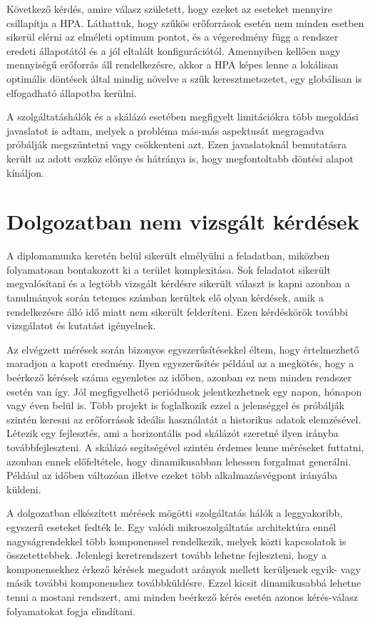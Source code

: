 Következő kérdés, amire válasz született, hogy ezeket az eseteket mennyire csillapítja a HPA.
Láthattuk, hogy szűkös erőforrások esetén nem minden esetben sikerül elérni az elméleti optimum pontot, és a végeredmény függ a rendszer eredeti állapotától és a jól eltalált konfigurációtól.
Amennyiben kellően nagy mennyiségű erőforrás áll rendelkezésre, akkor a HPA képes lenne a lokálisan optimális döntések által mindig növelve a szűk keresztmetszetet, egy globálisan is elfogadható állapotba kerülni.

A szolgáltatáshálók és a skálázó esetében megfigyelt limitációkra több megoldási javaslatot is adtam, melyek a probléma más-más aspektusát megragadva próbálják megszüntetni vagy csökkenteni azt.
Ezen javaslatoknál bemutatásra került az adott eszköz előnye és hátránya is, hogy megfontoltabb döntési alapot kínáljon.

\section{Dolgozatban nem vizsgált kérdések}
A diplomamunka keretén belül sikerült elmélyülni a feladatban, miközben folyamatosan bontakozott ki a terület komplexitása.
Sok feladatot sikerült megvalósítani és a legtöbb vizsgált kérdésre sikerült választ is kapni azonban a tanulmányok során tetemes számban kerültek elő olyan kérdések, amik a rendelkezésre álló idő miatt nem sikerült felderíteni.
Ezen kérdéskörök további vizsgálatot és kutatást igényelnek.

Az elvégzett mérések során bizonyos egyszerűsítésekkel éltem, hogy értelmezhető maradjon a kapott eredmény.
Ilyen egyszerűsítés például az a megkötés, hogy a beérkező kérések száma egyenletes az időben, azonban ez nem minden rendszer esetén van így.
Jól megfigyelhető periódusok jelentkezhetnek egy napon, hónapon vagy éven belül is.
Több projekt is foglalkozik ezzel a jelenséggel és próbálják szintén keresni az erőforrások ideális használatát a historikus adatok elemzésével.
Létezik egy fejlesztés, ami a horizontális pod skálázót szeretné ilyen irányba továbbfejleszteni\citep{predictiveHPAGithub}.
A skálázó segítségével szintén érdemes lenne méréseket futtatni, azonban ennek előfeltétele, hogy dinamikusabban lehessen forgalmat generálni.
Például az időben változóan illetve ezeket több alkalmazásvégpont irányába küldeni.

A dolgozatban elkészített mérések mögötti szolgáltatás hálók a leggyakoribb, egyszerű eseteket fedték le.
Egy valódi mikroszolgáltatás architektúra ennél nagyságrendekkel több komponenssel rendelkezik, melyek közti kapcsolatok is összetettebbek.
Jelenlegi keretrendszert tovább lehetne fejleszteni, hogy a komponensekhez érkező kérések megadott arányok mellett kerüljenek egyik- vagy másik további komponenshez továbbküldésre.
Ezzel kicsit dinamikusabbá lehetne tenni a mostani rendszert, ami minden beérkező kérés esetén azonos kérés-válasz folyamatokat fogja elindítani.


